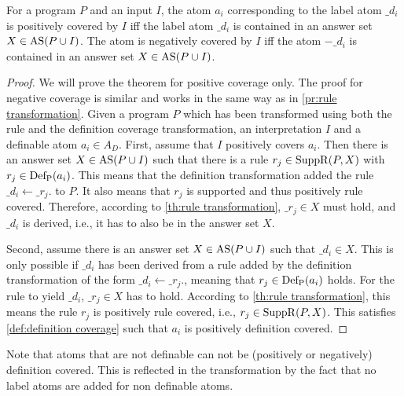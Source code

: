 \begin{theorem}
\label{th:definition transformation}
    For a program $P$ and an input $I$, the atom $a_i$ corresponding to the label atom $\_d_i$ is positively covered by $I$ iff the label atom $\_d_i$ is contained in an answer set \(X \in \operatorname{AS}(P \cup I)\). The atom is negatively covered by $I$ iff the atom $-\_d_i$ is contained in an answer set \(X \in \operatorname{AS}(P \cup I)\).
\end{theorem}

\begin{proof}
\label{pr:definition transformation}
    We will prove the theorem for positive coverage only. The proof for negative coverage is similar and works in the same way as in \cref{pr:rule transformation}.
    Given a program $P$ which has been transformed using both the rule and the definition coverage transformation, an interpretation $I$ and a definable atom \(a_i \in A_D\). First, assume that $I$ positively covers \(a_i\). Then there is an answer set \(X \in \operatorname{AS}(P \cup I)\) such that there is a rule \(r_j \in \operatorname{SuppR}(P, X)\) with \(r_j \in \operatorname{Def_P}(a_i)\). This means that the definition transformation added the rule \(\_d_i \leftarrow \_r_j.\) to $P$. It also means that $r_j$ is supported and thus positively rule covered. Therefore, according to \cref{th:rule transformation}, \(\_r_j \in X\) must hold, and $\_d_i$ is derived, i.e., it has to also be in the answer set $X$.

    Second, assume there is an answer set \(X \in \operatorname{AS}(P \cup I)\) such that \(\_d_i \in X\). This is only possible if $\_d_i$ has been derived from a rule added by the definition transformation of the form \(\_d_i \leftarrow \_r_j.\), meaning that \(r_j \in \operatorname{Def_P}(a_i)\) holds. For the rule to yield $\_d_i$, \(\_r_j \in X\) has to hold. According to \cref{th:rule transformation}, this means the rule $r_j$ is positively rule covered, i.e., \(r_j \in \operatorname{SuppR}(P, X)\). This satisfies \cref{def:definition coverage} such that $a_i$ is positively definition covered.
\end{proof}

Note that atoms that are not definable can not be (positively or negatively) definition covered. This is reflected in the transformation by the fact that no label atoms are added for non definable atoms.

